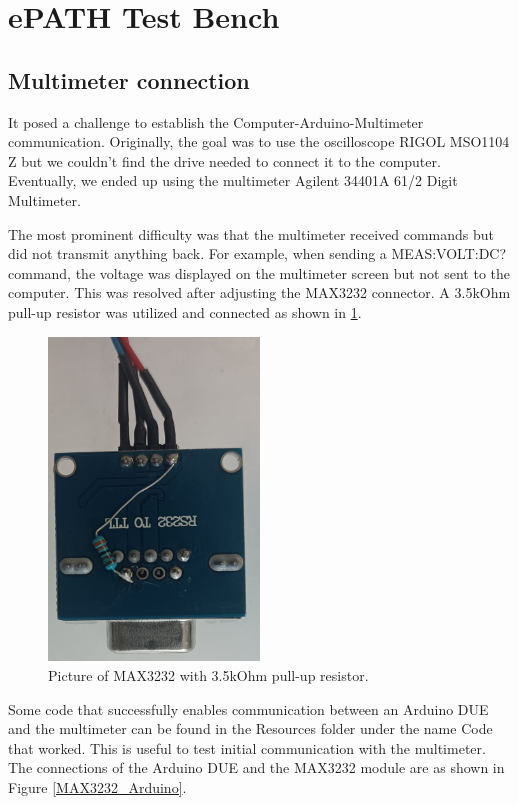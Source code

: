 \section{ePATH Test Bench}

\subsection{Multimeter connection}
It posed a challenge to establish the Computer-Arduino-Multimeter communication. Originally, the goal was to use the oscilloscope RIGOL MSO1104 Z but we couldn't find the drive needed to connect it to the computer. Eventually, we ended up using the multimeter Agilent 34401A 61/2 Digit Multimeter\cite{keysight34401A}. 

The most prominent difficulty was that the multimeter received commands but did not transmit anything back. For example, when sending a MEAS:VOLT:DC? command, the voltage was displayed on the multimeter screen but not sent to the computer. This was resolved after adjusting the MAX3232 connector. A 3.5kOhm pull-up resistor was utilized and connected as shown in \ref{MAX3232}.

\begin{figure}[H]
          \centering
          \includegraphics[angle=90, width=0.5\textwidth]{img/RS232_connector.jpeg}
          \caption{Picture of MAX3232 with 3.5kOhm pull-up resistor.}
          \label{MAX3232}
    \end{figure}

Some code that successfully enables communication between an Arduino DUE and the multimeter can be found in the Resources folder under the name Code that worked. This is useful to test initial communication with the multimeter. The connections of the Arduino DUE and the MAX3232 module are as shown in Figure \ref{MAX3232_Arduino}.

